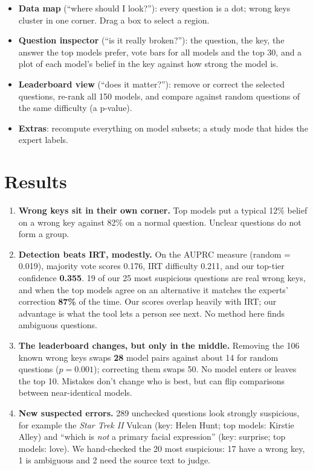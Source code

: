 \documentclass[11pt]{article}
\begin{document}
\begin{itemize}
  \item \textbf{Data map} (``where should I look?''): every question is a dot; wrong keys cluster in
    one corner. Drag a box to select a region.
  \item \textbf{Question inspector} (``is it really broken?''): the question, the key, the answer the
    top models prefer, vote bars for all models and the top 30, and a plot of each model's belief in
    the key against how strong the model is.
  \item \textbf{Leaderboard view} (``does it matter?''): remove or correct the selected questions,
    re-rank all 150 models, and compare against random questions of the same difficulty (a p-value).
  \item \textbf{Extras}: recompute everything on model subsets; a study mode that hides the expert labels.
\end{itemize}

\section{Results}

\begin{enumerate}
  \item \textbf{Wrong keys sit in their own corner.} Top models put a typical 12\% belief on a wrong
    key against 82\% on a normal question. Unclear questions do not form a group.
  \item \textbf{Detection beats IRT, modestly.} On the AUPRC measure (random = 0.019), majority vote
    scores 0.176, IRT difficulty 0.211, and our top-tier confidence \textbf{0.355}. 19 of our 25 most
    suspicious questions are real wrong keys, and when the top models agree on an alternative it
    matches the experts' correction \textbf{87\%} of the time. Our scores overlap heavily with IRT; our
    advantage is what the tool lets a person see next. No method here finds ambiguous questions.
  \item \textbf{The leaderboard changes, but only in the middle.} Removing the 106 known wrong keys
    swaps \textbf{28} model pairs against about 14 for random questions ($p = 0.001$); correcting them
    swaps 50. No model enters or leaves the top 10. Mistakes don't change who is best, but can flip
    comparisons between near-identical models.
  \item \textbf{New suspected errors.} 289 unchecked questions look strongly suspicious, for example
    the \emph{Star Trek II} Vulcan (key: Helen Hunt; top models: Kirstie Alley) and ``which is
    \emph{not} a primary facial expression'' (key: surprise; top models: love). We hand-checked the 20
    most suspicious: 17 have a wrong key, 1 is ambiguous and 2 need the source text to judge.
\end{enumerate}
\end{document}
